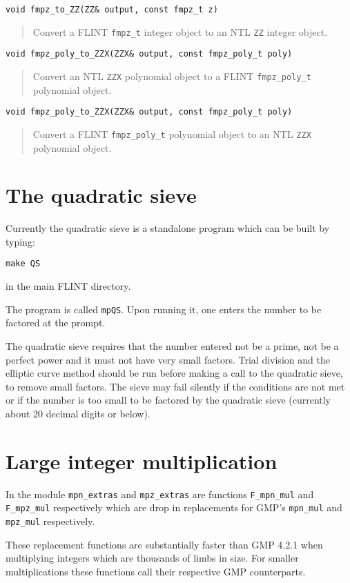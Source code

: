 \documentclass[a4paper,10pt]{article}
\newcommand{\code}{\lstinline}
\begin{document}
\begin{lstlisting}
void fmpz_to_ZZ(ZZ& output, const fmpz_t z)
\end{lstlisting}
\begin{quote}
Convert a FLINT \code{fmpz_t} integer object to an NTL \code{ZZ} integer object.
\end{quote}

\begin{lstlisting}
void fmpz_poly_to_ZZX(ZZX& output, const fmpz_poly_t poly)
\end{lstlisting}
\begin{quote}
Convert an NTL \code{ZZX} polynomial object to a FLINT \code{fmpz_poly_t} polynomial object.
\end{quote}

\begin{lstlisting}
void fmpz_poly_to_ZZX(ZZX& output, const fmpz_poly_t poly)
\end{lstlisting}
\begin{quote}
Convert a FLINT \code{fmpz_poly_t} polynomial object to an NTL \code{ZZX} polynomial object.
\end{quote}

\section{The quadratic sieve}
Currently the quadratic sieve is a standalone program which can be built by typing:

\code{make QS}

in the main FLINT directory.

The program is called \code{mpQS}. Upon running it, one enters the number to be factored at the prompt. 

The quadratic sieve requires that the number entered not be a prime, not be a perfect power and it must not have very small factors. Trial division and the elliptic curve method should be run before making a call to the quadratic sieve, to remove small factors. The sieve may fail silently if the conditions are not met or if the number is too small to be factored by the quadratic sieve (currently about 20 decimal digits or below).

\section{Large integer multiplication}
In the module \code{mpn_extras} and \code{mpz_extras} are functions \code{F_mpn_mul} and \code{F_mpz_mul} respectively which are drop in replacements for GMP's \code{mpn_mul} and \code{mpz_mul} respectively. 

These replacement functions are substantially faster than GMP 4.2.1 when multiplying integers which are thousands of limbs in size. For smaller multiplications these functions call their respective GMP counterparts.



\end{document}
